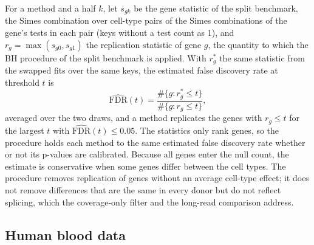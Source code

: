 \documentclass[11pt]{article}
\begin{document}
For a method and a half $k$, let $s_{gk}$ be the gene statistic of the split benchmark, the Simes combination over cell-type pairs of the Simes combinations of the gene's tests in each pair (keys without a test count as 1), and $r_g=\max(s_{g0},s_{g1})$ the replication statistic of gene $g$, the quantity to which the BH procedure of the split benchmark is applied. With $r^\ast_g$ the same statistic from the swapped fits over the same keys, the estimated false discovery rate at threshold $t$ is \[\widehat{\mathrm{FDR}}(t)=\frac{\#\{g:r^\ast_g\le t\}}{\#\{g:r_g\le t\}},\] averaged over the two draws, and a method replicates the genes with $r_g\le t$ for the largest $t$ with $\widehat{\mathrm{FDR}}(t)\le0.05$. The statistics only rank genes, so the procedure holds each method to the same estimated false discovery rate whether or not its p-values are calibrated. Because all genes enter the null count, the estimate is conservative when some genes differ between the cell types. The procedure removes replication of genes without an average cell-type effect; it does not remove differences that are the same in every donor but do not reflect splicing, which the coverage-only filter and the long-read comparison address.

\subsection{Human blood data}
\label{sec:pbmc}
\end{document}
